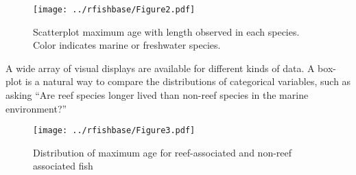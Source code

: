 \begin{Shaded}
\begin{Highlighting}[]
  \NormalTok{(}\NormalTok{, }\NormalTok{) +}
  \NormalTok{() + }\NormalTok{(}\NormalTok{(}\NormalTok{,}\NormalTok{,}\NormalTok{)) +}
  \NormalTok{(}\NormalTok{(}\NormalTok{,}\NormalTok{), }\NormalTok{(}\NormalTok{, }\NormalTok{)) + }
  \NormalTok{(}\NormalTok{) + }\NormalTok{(}\NormalTok{) +}
  \NormalTok{(}\NormalTok{(), }\NormalTok{(}\NormalTok{,}\NormalTok{), }\NormalTok{,}\NormalTok{)) +}
  \NormalTok{(} \NormalTok{())}
\end{Highlighting}
\end{Shaded}
\begin{figure}[htbp]
\centering
\texttt{[image: ../rfishbase/Figure2.pdf]}
\caption{Scatterplot maximum age with length observed in each species.
Color indicates marine or freshwater species.}
\end{figure}

A wide array of visual displays are available for different kinds of
data. A box-plot is a natural way to compare the distributions of
categorical variables, such as asking ``Are reef species longer lived
than non-reef species in the marine environment?''

\begin{Shaded}
\begin{Highlighting}[]
\NormalTok{(}
  \NormalTok{(}
  \NormalTok{() + }\NormalTok{(}\NormalTok{) +}
  \NormalTok{(}\NormalTok{)  +}
  \NormalTok{(} \NormalTok{(} \NormalTok{))}
\end{Highlighting}
\end{Shaded}
\begin{figure}[htbp]
\centering
\texttt{[image: ../rfishbase/Figure3.pdf]}
\caption{Distribution of maximum age for reef-associated and non-reef
associated fish}
\end{figure}

